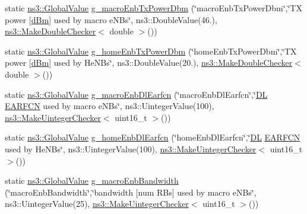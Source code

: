 \begin{DoxyCompactItemize}
\item 
static \hyperlink{classns3_1_1GlobalValue}{ns3\+::\+Global\+Value} \hyperlink{lena-dual-stripe_8cc_acf33feb28d1d3f521280889537bc891d}{g\+\_\+macro\+Enb\+Tx\+Power\+Dbm} (\char`\"{}macro\+Enb\+Tx\+Power\+Dbm\char`\"{},\char`\"{}TX power \mbox{[}\hyperlink{generate__test__data__lte__sinr_8m_a29e3c5e60f31e36ecdfd7ad769baea1c}{d\+Bm}\mbox{]} used by macro e\+N\+Bs\char`\"{}, ns3\+::\+Double\+Value(46.), \hyperlink{namespacens3_a0f8000e7b66dd988358648f0b16c7709}{ns3\+::\+Make\+Double\+Checker}$<$ double $>$())
\item 
static \hyperlink{classns3_1_1GlobalValue}{ns3\+::\+Global\+Value} \hyperlink{lena-dual-stripe_8cc_a464ff82dace5224dac84c5c2909e4eef}{g\+\_\+home\+Enb\+Tx\+Power\+Dbm} (\char`\"{}home\+Enb\+Tx\+Power\+Dbm\char`\"{},\char`\"{}TX power \mbox{[}\hyperlink{generate__test__data__lte__sinr_8m_a29e3c5e60f31e36ecdfd7ad769baea1c}{d\+Bm}\mbox{]} used by He\+N\+Bs\char`\"{}, ns3\+::\+Double\+Value(20.), \hyperlink{namespacens3_a0f8000e7b66dd988358648f0b16c7709}{ns3\+::\+Make\+Double\+Checker}$<$ double $>$())
\item 
static \hyperlink{classns3_1_1GlobalValue}{ns3\+::\+Global\+Value} \hyperlink{lena-dual-stripe_8cc_ad5eff44a4b04acd8e62dd63b404dd115}{g\+\_\+macro\+Enb\+Dl\+Earfcn} (\char`\"{}macro\+Enb\+Dl\+Earfcn\char`\"{},\char`\"{}\hyperlink{lte__uplink__power__control_8m_acbfa302723d9ea416f536a1ead7a5026}{DL} \hyperlink{mmwave_2model_2fading-traces_2fading__trace__generator_8m_aaf9d1de236e0d66a6386c33f6e66f766}{E\+A\+R\+F\+CN} used by macro e\+N\+Bs\char`\"{}, ns3\+::\+Uinteger\+Value(100), \hyperlink{namespacens3_aed274764da411ed9397a3524a7c9abb8}{ns3\+::\+Make\+Uinteger\+Checker}$<$ uint16\+\_\+t $>$())
\item 
static \hyperlink{classns3_1_1GlobalValue}{ns3\+::\+Global\+Value} \hyperlink{lena-dual-stripe_8cc_ac59d22cf4584fa3b4eff06328c3e14a1}{g\+\_\+home\+Enb\+Dl\+Earfcn} (\char`\"{}home\+Enb\+Dl\+Earfcn\char`\"{},\char`\"{}\hyperlink{lte__uplink__power__control_8m_acbfa302723d9ea416f536a1ead7a5026}{DL} \hyperlink{mmwave_2model_2fading-traces_2fading__trace__generator_8m_aaf9d1de236e0d66a6386c33f6e66f766}{E\+A\+R\+F\+CN} used by He\+N\+Bs\char`\"{}, ns3\+::\+Uinteger\+Value(100), \hyperlink{namespacens3_aed274764da411ed9397a3524a7c9abb8}{ns3\+::\+Make\+Uinteger\+Checker}$<$ uint16\+\_\+t $>$())
\item 
static \hyperlink{classns3_1_1GlobalValue}{ns3\+::\+Global\+Value} \hyperlink{lena-dual-stripe_8cc_a2783abc1567933836ed6b2a91b37773b}{g\+\_\+macro\+Enb\+Bandwidth} (\char`\"{}macro\+Enb\+Bandwidth\char`\"{},\char`\"{}bandwidth \mbox{[}num R\+Bs\mbox{]} used by macro e\+N\+Bs\char`\"{}, ns3\+::\+Uinteger\+Value(25), \hyperlink{namespacens3_aed274764da411ed9397a3524a7c9abb8}{ns3\+::\+Make\+Uinteger\+Checker}$<$ uint16\+\_\+t $>$())

\end{DoxyCompactItemize}
